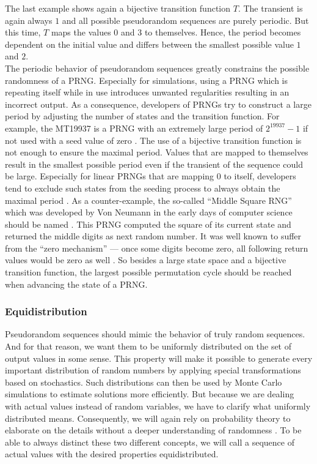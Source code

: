 \documentclass{stdlocal}
\begin{document}
  \noindent
  The last example shows again a bijective transition function $T$.
  The transient is again always $1$ and all possible pseudorandom sequences are purely periodic.
  But this time, $T$ maps the values $0$ and $3$ to themselves.
  Hence, the period becomes dependent on the initial value and differs between the smallest possible value $1$ and $2$.\\
  The periodic behavior of pseudorandom sequences greatly constrains the possible randomness of a PRNG.
  Especially for simulations, using a PRNG which is repeating itself while in use introduces unwanted regularities resulting in an incorrect output.
  As a consequence, developers of PRNGs try to construct a large period by adjusting the number of states and the transition function.
  For example, the MT19937 is a PRNG with an extremely large period of $2^{19937}-1$ if not used with a seed value of zero \autocite{matsumoto1998}.
  The use of a bijective transition function is not enough to ensure the maximal period.
  Values that are mapped to themselves result in the smallest possible period even if the transient of the sequence could be large.
  Especially for linear PRNGs that are mapping $0$ to itself, developers tend to exclude such states from the seeding process to always obtain the maximal period \autocite{marsaglia2003,blackman2019}.
  As a counter-example, the so-called \enquote{Middle Square RNG} which was developed by Von Neumann in the early days of computer science should be named \autocites[\ppno~12-15]{kneusel2018}{widynski2019}.
  This PRNG computed the square of its current state and returned the middle digits as next random number.
  It was well known to suffer from the \enquote{zero mechanism} --- once some digits become zero, all following return values would be zero as well \autocites[\ppno~12-15]{kneusel2018}{widynski2019}.
  So besides a large state space and a bijective transition function, the largest possible permutation cycle should be reached when advancing the state of a PRNG.

  \subsubsection*{Equidistribution}
  Pseudorandom sequences should mimic the behavior of truly random sequences.
  And for that reason, we want them to be uniformly distributed on the set of output values in some sense.
  This property will make it possible to generate every important distribution of random numbers by applying special transformations based on stochastics.
  Such distributions can then be used by Monte Carlo simulations to estimate solutions more efficiently.
  But because we are dealing with actual values instead of random variables, we have to clarify what uniformly distributed means.
  Consequently, we will again rely on probability theory to elaborate on the details without a deeper understanding of randomness \autocite{eisner2019}.
  To be able to always distinct these two different concepts, we will call a sequence of actual values with the desired properties equidistributed.
\end{document}
